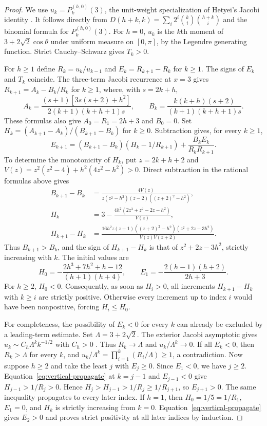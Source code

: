 \documentclass[11pt,a4paper]{article}
\begin{document}
\begin{proof}
We use $u_k=P_k^{(h,0)}(3)$, the unit-weight specialization of Hetyei's
Jacobi identity \cite[Prop.~2.9]{hetyei}. It follows directly from
$D(h+k,k)=\sum_i2^i\binom{k}{i}\binom{h+k}{i}$ and the binomial formula
for $P_k^{(h,0)}(3)$. For $h=0$, $u_k$ is the $k$th moment of
$3+2\sqrt{2}\cos\theta$ under uniform measure on $[0,\pi]$, by the
Legendre generating function. Strict Cauchy--Schwarz gives $T_k>0$.

For $h\ge1$ define $R_k=u_k/u_{k-1}$ and $E_k=R_{k+1}-R_k$ for
$k\ge1$. The signs of $E_k$ and $T_k$ coincide. The three-term Jacobi
recurrence at $x=3$ gives $R_{k+1}=A_k-B_k/R_k$ for $k\ge1$, where,
with $s=2k+h$,
\[
 A_k=\frac{(s+1)[3s(s+2)+h^2]}{2(k+1)(k+h+1)s},\qquad
 B_k=\frac{k(k+h)(s+2)}{(k+1)(k+h+1)s}.
\]
These formulas also give $A_0=R_1=2h+3$ and $B_0=0$. Set
$H_k=(A_{k+1}-A_k)/(B_{k+1}-B_k)$ for $k\ge0$. Subtraction gives,
for every $k\ge1$,
\begin{equation}\label{eq:vertical-propagate}
 E_{k+1}=(B_{k+1}-B_k)(H_k-1/R_{k+1})
          +\frac{B_k E_k}{R_kR_{k+1}}.
\end{equation}
To determine the monotonicity of $H_k$, put $z=2k+h+2$ and
$V(z)=z^2(z^2-4)+h^2(4z^2-h^2)>0$. Direct subtraction in the rational
formulas above gives
\begin{align*}
 B_{k+1}-B_k&=\frac{4V(z)}{z(z^2-h^2)(z-2)((z+2)^2-h^2)},\\
 H_k&=3-\frac{4h^2(2z^3+z^2-2z-h^2)}{V(z)},\\
 H_{k+1}-H_k&=\frac{16h^2 z(z+1)((z+2)^2-h^2)(z^2+2z-3h^2)}
                      {V(z)V(z+2)}.
\end{align*}
Thus $B_{k+1}>B_k$, and the sign of $H_{k+1}-H_k$ is that of
$z^2+2z-3h^2$, strictly increasing with $k$. The initial values are
\[
 H_0=-\frac{2h^3+7h^2+h-12}{(h+1)(h+4)},\qquad
 E_1=-\frac{2(h-1)(h+2)}{2h+3}.
\]
For $h\ge2$, $H_0<0$. Consequently, as soon as $H_i>0$, all increments
$H_{k+1}-H_k$ with $k\ge i$ are strictly positive. Otherwise every increment
up to index $i$ would have been nonpositive, forcing $H_i\le H_0$.

For completeness, the possibility of $E_k<0$ for every $k$ can already be
excluded by a leading-term estimate. Set $\Lambda=3+2\sqrt2$. The exterior
Jacobi asymptotic gives $u_k\sim C_h\Lambda^k k^{-1/2}$ with $C_h>0$
\cite[Thm.~8.21.9]{szego}. Thus $R_k\to\Lambda$ and $u_k/\Lambda^k\to0$.
If all $E_k<0$, then $R_k>\Lambda$ for every $k$, and
$u_k/\Lambda^k=\prod_{i=1}^k(R_i/\Lambda)\ge1$, a contradiction.
Now suppose $h\ge2$ and take the least $j$ with $E_j\ge0$. Since $E_1<0$,
we have $j\ge2$. Equation~\eqref{eq:vertical-propagate} at $k=j-1$ and
$E_{j-1}<0$ give $H_{j-1}>1/R_j>0$. Hence
$H_j>H_{j-1}>1/R_j\ge 1/R_{j+1}$, so $E_{j+1}>0$. The same inequality
propagates to every later index. If $h=1$, then $H_0=1/5=1/R_1$, $E_1=0$,
and $H_k$ is strictly increasing from $k=0$. Equation~\eqref{eq:vertical-propagate}
gives $E_2>0$ and proves strict positivity at all later indices by induction.
\end{proof}
\end{document}
